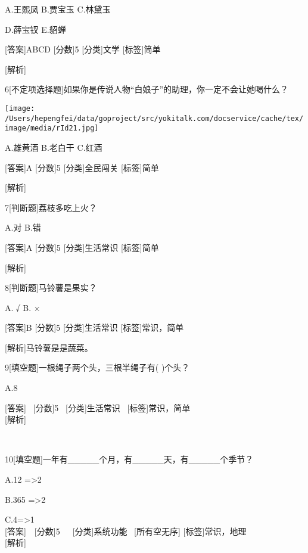 A.王熙凤 B.贾宝玉 C.林黛玉

D.薛宝钗 E.貂蝉

{[}答案{]}ABCD {[}分数{]}5 {[}分类{]}文学 {[}标签{]}简单

{[}解析{]}

6{[}不定项选择题{]}如果你是传说人物``白娘子''的助理，你一定不会让她喝什么？

\texttt{[image: /Users/hepengfei/data/goproject/src/yokitalk.com/docservice/cache/tex/image/media/rId21.jpg]}

A.雄黄酒 B.老白干 C.红酒

{[}答案{]}A {[}分数{]}5 {[}分类{]}全民闯关 {[}标签{]}简单

{[}解析{]}

7{[}判断题{]}荔枝多吃上火？

A.对 B.错

{[}答案{]}A {[}分数{]}5 {[}分类{]}生活常识 {[}标签{]}简单

{[}解析{]}

8{[}判断题{]}马铃薯是果实？

A. √ B. ×

{[}答案{]}B {[}分数{]}5 {[}分类{]}生活常识 {[}标签{]}常识，简单

{[}解析{]}马铃薯是是蔬菜。

9{[}填空题{]}一根绳子两个头，三根半绳子有( )个头？

A.8

{[}答案{]}~ {[}分数{]}5~ {[}分类{]}生活常识~ {[}标签{]}常识，简单\\
{[}解析{]}

~

10{[}填空题{]}一年有\_\_\_\_\_个月，有\_\_\_\_\_天，有\_\_\_\_\_个季节？

A.12 =\textgreater2

B.365 =\textgreater2

C.4=\textgreater1\\
{[}答案{]}~~{[}分数{]}5~~~{[}分类{]}系统功能~ {[}所有空无序{]}
{[}标签{]}常识，地理\\
{[}解析{]}~~~
